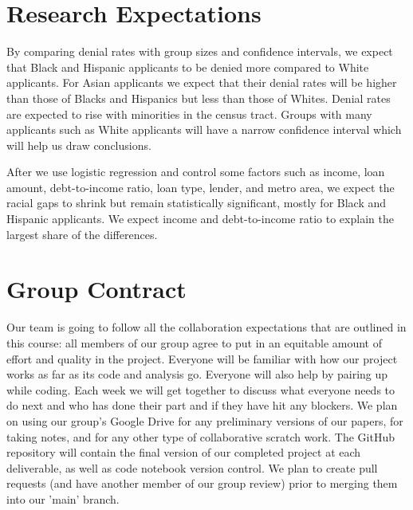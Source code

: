 \documentclass[manuscript,authorversion,nonacm]{acmart}
\begin{document}
\section{Research Expectations}

By comparing denial rates with group sizes and confidence intervals, we expect that Black and Hispanic applicants to be denied more compared to White applicants. For Asian applicants we expect that their denial rates will be higher than those of Blacks and Hispanics but less than those of Whites. Denial rates are expected to rise with minorities in the census tract. Groups with many applicants such as White applicants will have a narrow confidence interval which will help us draw conclusions.

After we use logistic regression and control some factors such as income, loan amount, debt-to-income ratio, loan type, lender, and metro area, we expect the racial gaps to shrink but remain statistically significant, mostly for Black and Hispanic applicants. We expect income and debt-to-income ratio to explain the largest share of the differences.

\section{Group Contract}

Our team is going to follow all the collaboration expectations that are outlined in this course: all members of our group agree to put in an equitable amount of effort and quality in the project. Everyone will be familiar with how our project works as far as its code and analysis go. Everyone will also help by pairing up while coding. Each week we will get together to discuss what everyone needs to do next and who has done their part and if they have hit any blockers. We plan on using our group's Google Drive for any preliminary versions of our papers, for taking notes, and for any other type of collaborative scratch work. The GitHub repository will contain the final version of our completed project at each deliverable, as well as code notebook version control. We plan to create pull requests (and have another member of our group review) prior to merging them into our 'main' branch.
\end{document}
